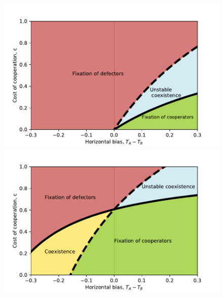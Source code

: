 \documentclass[12pt]{extarticle}
\begin{document}
{\begin{figure}[htb]
    \includegraphics[scale=0.75]{boundiries_alpha0.pdf}

    \includegraphics[scale=0.75]{boundiries_non_zero_alpha.pdf}
    

\end{figure}}
\end{document}
